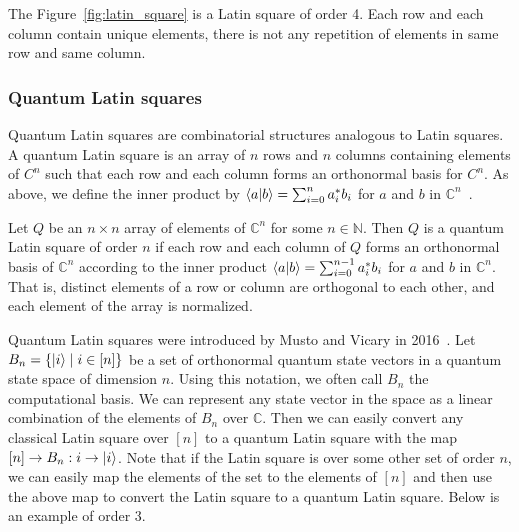  The Figure~\ref{fig:latin_square} is a Latin square of order 4. Each row and each column contain unique elements, there is not any repetition of elements in same row and same column.

\subsubsection{Quantum Latin squares}

Quantum Latin squares are combinatorial structures analogous to Latin squares.
A quantum Latin square is an array of $n$ rows and $n$ columns containing elements of $C^n$ such that each row and each column forms an orthonormal basis for $C^n$.
As above, we define the inner product by $\braket{a | b} = \sum_{i=0}^{n} a_i^* b_i$ for $a$ and $b$ in $\mathbb{C}^n$~\cite{zauner2011QuantumDesignsFoundations}.


\begin{definition}
  Let $Q$ be an $n \times n$ array of elements of $\mathbb{C}^n$ for some $n \in \mathbb{N}$.
  Then $Q$ is a quantum Latin square of order $n$ if each row and each column of $Q$ forms an orthonormal basis of $\mathbb{C}^n$ according to the inner product $\braket{a | b} = \sum_{i=0}^{n-1} a_i^* b_i$ for $a$ and $b$ in $\mathbb{C}^n$.
  That is, distinct elements of a row or column are orthogonal to each other, and each element of the array is normalized.
\end{definition}


\noindent Quantum Latin squares were introduced by Musto and Vicary in 2016~\cite{vicary2016QuantumLatinSquares}.
Let $B_n = \{\ket{i} \mid i \in [n]\}$ be a set of orthonormal quantum state vectors in a quantum state space of dimension $n$.
Using this notation, we often call $B_n$ the computational basis.
We can represent any state vector in the space as a linear combination of the elements of $B_n$ over $\mathbb{C}$.
Then we can easily convert any classical Latin square over $[n]$ to a quantum Latin square with the map $[n] \rightarrow B_n: i \rightarrow \ket{i}$.
Note that if the Latin square is over some other set of order $n$, we can easily map the elements of the set to the elements of $[n]$ and then use the above map to convert the Latin square to a quantum Latin square.
Below is an example of order $3$.


